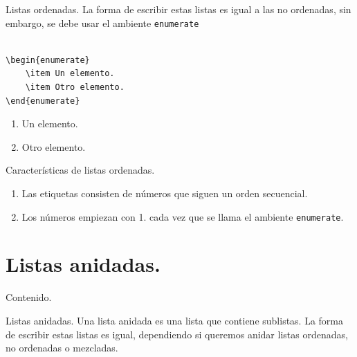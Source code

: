 \documentclass[dvipsnames,xcolor, handout]{beamer}
\theoremstyle{plain}
\theoremstyle{definition}
\begin{document}
\begin{frame}[fragile]{Listas ordenadas.}
La forma de escribir estas listas es igual a las no ordenadas, sin embargo, se debe usar el ambiente \verb!enumerate! \\~\\ \pause
\begin{minipage}{0.5\linewidth}
\begin{verbatim}
\begin{enumerate}
    \item Un elemento.
    \item Otro elemento.
\end{enumerate}    
\end{verbatim}
    \end{minipage}\pause
    \begin{minipage}{0.5\linewidth}
    \begin{enumerate}
    \item Un elemento.
    \item Otro elemento.
\end{enumerate}    
    \end{minipage}

\end{frame}

\begin{frame}[fragile]{Características de listas ordenadas.}
    \begin{enumerate}
        \item Las etiquetas consisten de números que siguen un orden secuencial.
        \item Los números empiezan con 1. cada vez que se llama el ambiente \verb!enumerate!.
    \end{enumerate}
\end{frame}

\section{Listas anidadas.}
\begin{frame}{Contenido.}
  \tableofcontents[currentsection]
\end{frame}

\begin{frame}[fragile]{Listas anidadas.}
Una lista anidada es una lista que contiene sublistas. La forma de escribir estas listas es igual, dependiendo si queremos anidar listas ordenadas, no ordenadas o mezcladas. 
\end{frame}
\end{document}
